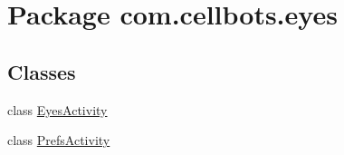 \hypertarget{namespacecom_1_1cellbots_1_1eyes}{\section{Package com.\-cellbots.\-eyes}
\label{namespacecom_1_1cellbots_1_1eyes}
}
\subsection*{Classes}
\begin{DoxyCompactItemize}
\item 
class \hyperlink{classcom_1_1cellbots_1_1eyes_1_1_eyes_activity}{Eyes\-Activity}
\item 
class \hyperlink{classcom_1_1cellbots_1_1eyes_1_1_prefs_activity}{Prefs\-Activity}
\end{DoxyCompactItemize}
